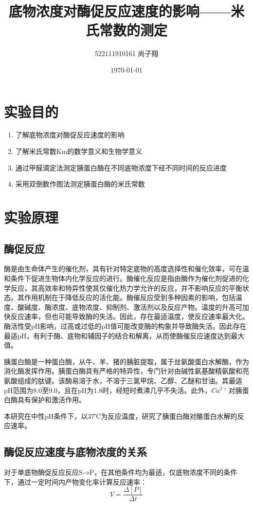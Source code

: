 \documentclass[UTF8]{ctexart}
\title{底物浓度对酶促反应速度的影响——米氏常数的测定}
\author{522111910161 尚子翔}
\date{\today}
\begin{document}
	
	\fancyhead[L]{}
	\fancyfoot[C]{\thepage}
	
	\maketitle
	\tableofcontents
	\newpage
	
	\section{实验目的}
	\begin{enumerate}
		\item 了解底物浓度对酶促反应速度的影响
		\item 了解米氏常数Km的数学意义和生物学意义
		\item 通过甲醛滴定法测定胰蛋白酶在不同底物浓度下经不同时间的反应进度
		\item 采用双倒数作图法测定胰蛋白酶的米氏常数
	\end{enumerate}
	
	\section{实验原理}
	\subsection{酶促反应}
	酶是由生命体产生的催化剂，具有针对特定底物的高度选择性和催化效率，可在温和条件下促进生物体内化学反应的进行。酶催化反应是指由酶作为催化剂促进的化学反应，其高效率和特异性使其仅催化热力学允许的反应，并不影响反应的平衡状态。其作用机制在于降低反应的活化能。酶催反应受到多种因素的影响，包括温度、酸碱度、酶浓度、底物浓度、抑制剂、激活剂以及反应产物。温度的升高可加快反应速率，但也可能导致酶的失活。因此，存在最适温度，使反应速率最大化。酶活性受pH影响，过高或过低的pH值可能改变酶的构象并导致酶失活。因此存在最适pH，有利于酶、底物和辅因子的结合和解离，从而使酶催反应速度达到最大值。
	
	胰蛋白酶是一种蛋白酶，从牛、羊、猪的胰脏提取，属于丝氨酸蛋白水解酶，作为消化酶发挥作用。胰蛋白酶具有严格的特异性，专门针对由碱性氨基酸精氨酸和亮氨酸组成的肽键。该酶易溶于水，不溶于三氯甲烷、乙醇、乙醚和甘油。其最适pH范围为8.0至9.0，且在pH为1.8时，经短时煮沸几乎不失活。此外，$Ca^{2+}$对胰蛋白酶具有保护和激活作用。
		
		本研究在中性pH条件下，以37℃为反应温度，研究了胰蛋白酶对酪蛋白水解的反应速率。
	\subsection{酶促反应速度与底物浓度的关系}
	对于单底物酶促反应反应S→P，在其他条件均为最适，仅底物浓度不同的条件下，通过一定时间内产物变化率计算反应速率：\[V=\frac{\Delta [P]}{\Delta t}\]
		
\end{document}
